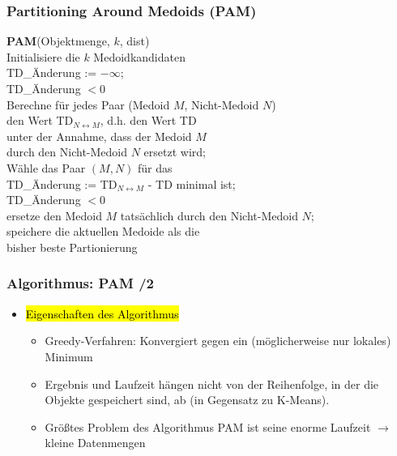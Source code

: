 
\begin{frame}
\frametitle{Partitioning Around Medoids (PAM)}

\begin{algo}
\textbf{PAM}(Objektmenge, $k$, dist) \\
\1 \textrm{Initialisiere die $k$ Medoidkandidaten} \\
\1 TD\_Änderung := $-\infty$; \\
\1  TD\_Änderung $< 0$  \\
\2 \textrm{Berechne für jedes Paar (Medoid $M$, Nicht-Medoid $N$)}\\
\3 \textrm{den Wert} TD$_{N\leftrightarrow M}$, \textrm{d.h. den Wert} TD \\
\3 \textrm{unter der Annahme, dass der Medoid $M$} \\
\3 \textrm{durch den Nicht-Medoid $N$ ersetzt wird;}  \\
\2 \textrm{Wähle das Paar $(M, N)$ für das} \\
\3 TD\_Änderung := TD$_{N\leftrightarrow M}$ - TD \textrm{minimal ist;} \\
\2 TD\_Änderung $< 0$  \\
\3 \textrm{ersetze den Medoid $M$ tatsächlich durch den Nicht-Medoid $N$;} \\
\3 \textrm{speichere die aktuellen Medoide als die} \\
\4 \textrm{bisher beste Partionierung}
\end{algo}

\end{frame}


\begin{frame}
\frametitle{Algorithmus: PAM /2}

\begin{itemize}

\item\hl{Eigenschaften des Algorithmus}
\begin{itemize}
\item Greedy-Verfahren: Konvergiert gegen ein (möglicherweise nur
  lokales) Minimum
\item Ergebnis und Laufzeit hängen nicht von der Reihenfolge, in der
  die Objekte gespeichert sind, ab (in Gegensatz zu K-Means).
\item Größtes Problem des Algorithmus PAM ist seine enorme Laufzeit
  $\rightarrow$ kleine Datenmengen
\end{itemize}
\end{itemize}

\end{frame}

